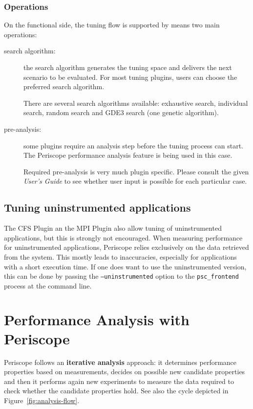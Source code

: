 \documentclass[11pt,oneside,a4paper]{book}
\begin{document}
\subsection*{Operations}
On the functional side, the tuning flow is supported by means two main operations:

\begin{description}
	\item[search algorithm:] the search algorithm generates the tuning space and  delivers the next scenario to be evaluated. For most tuning plugins, users can choose the preferred search algorithm.
	
	There are several search algorithms available: exhaustive search, individual search, random search and GDE3 search (one genetic algorithm).
	
	\item[pre-analysis:] some plugins require an analysis step before the tuning process can start. The Periscope performance analysis feature is being used in this case.
	
	Required pre-analysis is very much plugin specific. Please consult the given \textit{User's Guide} to see whether user input is possible for each particular case.
	
\end{description}



\section{Tuning uninstrumented applications}

The CFS Plugin an the MPI Plugin also allow tuning of uninstrumented applications, but this is strongly not encouraged. When measuring performance for uninstrumented applications, Periscope relies exclusively on the data retrieved from the system. This mostly leads to inaccuracies, especially for applications with a short execution time. If one does want to use the uninstrumented version, this can be done by passing the \texttt{--uninstrumented} option to the \texttt{psc\_frontend} process at the command line.



\chapter{Performance Analysis with Periscope}

Periscope follows an \textbf{iterative analysis} approach: it determines performance properties based on measurements, decides on possible new candidate properties and then it performs again new experiments to measure the data required to check whether the candidate properties hold. See also the cycle depicted in Figure~\ref{fig:analysis-flow}.
\end{document}
